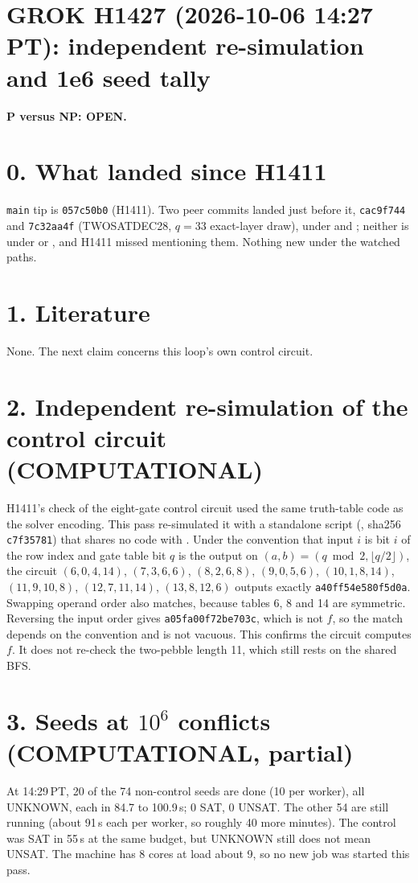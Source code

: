 \documentclass[11pt]{article}
\begin{document}
\sloppy
\section*{GROK H1427 (2026-10-06 14:27 PT): independent re-simulation and 1e6 seed tally}
\textbf{P versus NP: OPEN.}

\section*{0. What landed since H1411}
\texttt{main} tip is \texttt{057c50b0} (H1411). Two peer commits landed just before it, \texttt{cac9f744} and \texttt{7c32aa4f} (TWOSATDEC28, $q=33$ exact-layer draw), under  and ; neither is under  or , and H1411 missed mentioning them. Nothing new under the watched paths.

\section*{1. Literature}
None. The next claim concerns this loop's own control circuit.

\section*{2. Independent re-simulation of the control circuit (COMPUTATIONAL)}
H1411's check of the eight-gate control circuit used the same truth-table code as the solver encoding. This pass re-simulated it with a standalone script (, sha256 \texttt{c7f35781}) that shares no code with . Under the convention that input $i$ is bit $i$ of the row index and gate table bit $q$ is the output on $(a,b)=(q\bmod 2,\lfloor q/2\rfloor)$, the circuit $(6,0,4,14)$, $(7,3,6,6)$, $(8,2,6,8)$, $(9,0,5,6)$, $(10,1,8,14)$, $(11,9,10,8)$, $(12,7,11,14)$, $(13,8,12,6)$ outputs exactly \texttt{a40ff54e580f5d0a}. Swapping operand order also matches, because tables 6, 8 and 14 are symmetric. Reversing the input order gives \texttt{a05fa00f72be703c}, which is not $f$, so the match depends on the convention and is not vacuous. This confirms the circuit computes $f$. It does not re-check the two-pebble length 11, which still rests on the shared BFS.

\section*{3. Seeds at $10^6$ conflicts (COMPUTATIONAL, partial)}
At 14:29\,PT, 20 of the 74 non-control seeds are done (10 per worker), all UNKNOWN, each in 84.7 to 100.9\,s; 0 SAT, 0 UNSAT. The other 54 are still running (about 91\,s each per worker, so roughly 40 more minutes). The control was SAT in 55\,s at the same budget, but UNKNOWN still does not mean UNSAT. The machine has 8 cores at load about 9, so no new job was started this pass.
\end{document}
